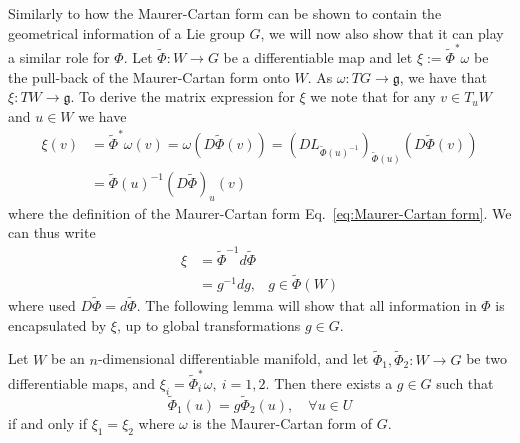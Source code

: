 Similarly to how the Maurer-Cartan form can be shown to contain the geometrical information of a Lie group $G$, we will now also show that it can play a similar role for $\Phi$. Let $\tilde{\Phi} : W \to G$ be a differentiable map and let $\xi := \tilde{\Phi}^* \omega$ be the pull-back of the Maurer-Cartan form onto $W$. As $\omega : TG \to \mathfrak{g}$, we have that $\xi : TW \to \mathfrak{g}$. To derive the matrix expression for $\xi$ we note that for any $v \in T_u W$ and $u \in W$ we have
\begin{equation}
\begin{aligned}
\xi(v) & = \tilde{\Phi}^* \omega(v)  = \omega(D\tilde{\Phi}(v)) = ( D L_{ \tilde{\Phi}(u)^{-1} } )_{ \tilde{\Phi}(u) }( D\tilde{\Phi}(v)  ) \\
& = \tilde{\Phi}(u)^{-1} (D\tilde{\Phi})_u (v)
\end{aligned}
\end{equation}
where the definition of the Maurer-Cartan form Eq.~\ref{eq:Maurer-Cartan form}. We can thus write
\begin{equation} \label{eq:pullback Maurer-Cartan}
\begin{aligned}
\xi & = \tilde{\Phi}^{-1} d \tilde{\Phi} \\
& = g^{-1} dg, & g \in \tilde{\Phi}(W)
\end{aligned}
\end{equation}
where used $D\tilde{\Phi} = d\tilde{\Phi}$. The following lemma will show that all information in $\Phi$ is encapsulated by $\xi$, up to global transformations $g \in G$.

\begin{lemma}
Let $W$ be an $n$-dimensional differentiable manifold, and let $\tilde{\Phi}_1, \tilde{\Phi}_2 : W \to G$ be two differentiable maps, and $\xi_i = \tilde{\Phi}^*_i \omega,\ i=1,2$. Then there exists a $g \in G$ such that
\begin{equation} \label{eq:global transformations of Phi}
\tilde{\Phi}_1(u) =  g \tilde{\Phi}_2(u), \quad \forall u\in U
\end{equation}
if and only if $\xi_1 = \xi_2$ where $\omega$ is the Maurer-Cartan form of $G$.
\end{lemma}

